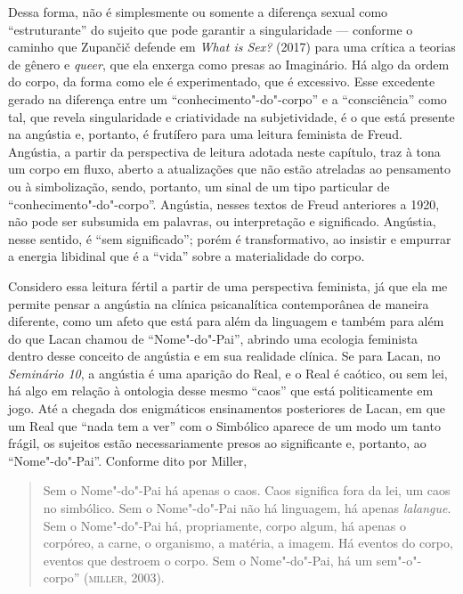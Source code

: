 Dessa forma, não é simplesmente ou somente a diferença sexual como
``estruturante'' do sujeito que pode garantir a singularidade ---
conforme o caminho que Zupančič defende em \emph{What is Sex?} (2017)
para uma crítica a teorias de gênero e \emph{queer}, que ela enxerga
como presas ao Imaginário. Há algo da ordem do corpo, da forma como ele
é experimentado, que é excessivo. Esse excedente gerado na diferença
entre um ``conhecimento"-do"-corpo'' e a ``consciência'' como tal, que
revela singularidade e criatividade na subjetividade, é o que está
presente na angústia e, portanto, é frutífero para uma leitura feminista
de Freud. Angústia, a partir da perspectiva de leitura adotada neste
capítulo, traz à tona um corpo em fluxo, aberto a atualizações que não
estão atreladas ao pensamento ou à simbolização, sendo, portanto, um
sinal de um tipo particular de ``conhecimento"-do"-corpo''. Angústia,
nesses textos de Freud anteriores a 1920, não pode ser subsumida em
palavras, ou interpretação e significado. Angústia, nesse sentido, é
``sem significado''; porém é transformativo, ao insistir e empurrar a
energia libidinal que é a ``vida'' sobre a materialidade do corpo.

Considero essa leitura fértil a partir de uma perspectiva feminista, já
que ela me permite pensar a angústia na clínica psicanalítica
contemporânea de maneira diferente, como um afeto que está para além da
linguagem e também para além do que Lacan chamou de ``Nome"-do"-Pai'',
abrindo uma ecologia feminista dentro desse conceito de angústia e em
sua realidade clínica. Se para Lacan, no \emph{Seminário 10}, a angústia é uma
aparição do Real, e o Real é caótico, ou sem lei, há algo em relação à
ontologia desse mesmo ``caos'' que está politicamente em jogo. Até a
chegada dos enigmáticos ensinamentos posteriores de Lacan, em que um
Real que ``nada tem a ver'' com o Simbólico aparece de um modo um tanto
frágil, os sujeitos estão necessariamente presos ao significante e,
portanto, ao ``Nome"-do"-Pai''. Conforme dito por Miller,

\begin{quote}
Sem o Nome"-do"-Pai há apenas o caos. Caos significa fora da lei, um caos
no simbólico. Sem o Nome"-do"-Pai não há linguagem, há apenas
\emph{lalangue}. Sem o Nome"-do"-Pai há, propriamente, corpo algum, há
apenas o corpóreo, a carne, o organismo, a matéria, a imagem. Há eventos
do corpo, eventos que destroem o corpo. Sem o Nome"-do"-Pai, há um
sem"-o"-corpo'' (\textsc{miller}, 2003).
\end{quote}

